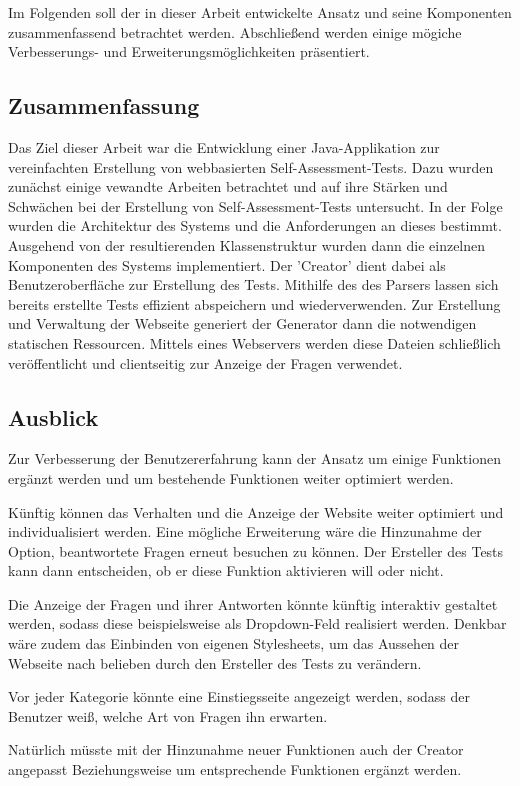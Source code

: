 \label{Zusammenfassung_Ausblick} 

Im Folgenden soll der in dieser Arbeit entwickelte Ansatz und seine Komponenten zusammenfassend betrachtet werden. Abschließend werden einige mögiche Verbesserungs- und Erweiterungsmöglichkeiten präsentiert.

\subsection{Zusammenfassung}

Das Ziel dieser Arbeit war die Entwicklung einer Java-Applikation zur vereinfachten Erstellung von webbasierten Self-Assessment-Tests. Dazu wurden zunächst einige vewandte Arbeiten betrachtet und auf ihre Stärken und Schwächen bei der Erstellung von Self-Assessment-Tests untersucht. In der Folge wurden die Architektur des Systems und die Anforderungen an dieses bestimmt. Ausgehend von der resultierenden Klassenstruktur wurden dann die einzelnen Komponenten des Systems implementiert. Der 'Creator' dient dabei als Benutzeroberfläche zur Erstellung des Tests. Mithilfe des des Parsers lassen sich bereits erstellte Tests effizient abspeichern und wiederverwenden. Zur Erstellung und Verwaltung der Webseite generiert der Generator dann die notwendigen statischen Ressourcen. Mittels eines Webservers werden diese Dateien schließlich veröffentlicht und clientseitig zur Anzeige der Fragen verwendet.

\subsection{Ausblick}

Zur Verbesserung der Benutzererfahrung kann der Ansatz um einige Funktionen ergänzt werden und um bestehende Funktionen weiter optimiert werden. 

Künftig können das Verhalten und die Anzeige der Website weiter optimiert und individualisiert werden.  
Eine mögliche Erweiterung wäre die Hinzunahme der Option, beantwortete Fragen erneut besuchen zu können. Der Ersteller des Tests kann dann entscheiden, ob er diese Funktion aktivieren will oder nicht.

Die Anzeige der Fragen und ihrer Antworten könnte künftig interaktiv gestaltet werden, sodass diese beispielsweise als Dropdown-Feld realisiert werden. Denkbar wäre zudem das Einbinden von eigenen Stylesheets, um das Aussehen der Webseite nach belieben durch den Ersteller des Tests zu verändern.

Vor jeder Kategorie könnte eine Einstiegsseite angezeigt werden, sodass der Benutzer weiß, welche Art von Fragen ihn erwarten. 

Natürlich müsste mit der Hinzunahme neuer Funktionen auch der Creator angepasst Beziehungsweise um entsprechende Funktionen ergänzt werden.